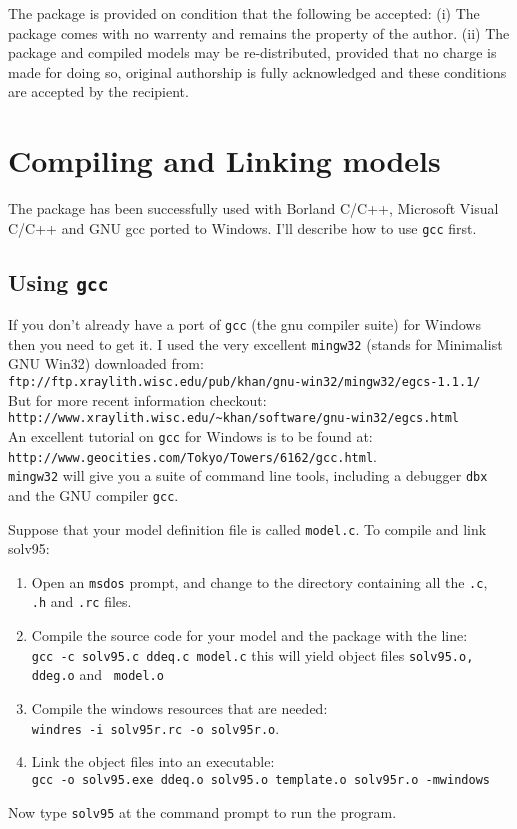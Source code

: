 \documentclass[10pt] {article}
\begin{document}
The package is provided on condition that the following be accepted: (i) The package comes with %
no warrenty and remains the property of the author. (ii) The package and compiled models may be %
re-distributed, provided that no charge is made for doing so, original authorship is fully %
acknowledged and these conditions are accepted by the recipient.   

\section{Compiling and Linking models}

The package has been successfully used with Borland C/C++, Microsoft Visual C/C++ and GNU gcc %
ported to Windows. I'll describe how to use \verb+gcc+ first.

\subsection{Using {\tt gcc}}

If you don't already have a port of \verb+gcc+ (the gnu compiler suite) for Windows then you need %
to get it. I used the very excellent \verb+mingw32+ (stands for Minimalist GNU Win32) downloaded %
from:\\
\verb+ftp://ftp.xraylith.wisc.edu/pub/khan/gnu-win32/mingw32/egcs-1.1.1/+ \\
But for more recent information checkout:\\
\verb+http://www.xraylith.wisc.edu/~khan/software/gnu-win32/egcs.html+\\
An excellent tutorial on \verb+gcc+ for Windows is to be found at:\\
\verb+http://www.geocities.com/Tokyo/Towers/6162/gcc.html+.\\
\verb+mingw32+ will give you a suite of command line tools, including a debugger \verb+dbx+ and %
the GNU compiler \verb+gcc+.

Suppose that your model definition file is called {\tt model.c}. To compile and link solv95:
\begin{enumerate}
\item Open an {\tt msdos} prompt, and change to the directory containing all the {\tt .c}, {\tt %
.h} and {\tt .rc} files.
\item Compile the source code for your model and the package with the line:\\
{\tt gcc -c solv95.c ddeq.c model.c} this will yield object files {\tt solv95.o, ddeg.o} and {\tt %
model.o}
\item Compile the windows resources that are needed:\\
{\tt windres -i solv95r.rc -o solv95r.o}.
\item Link the object files into an executable:\\
{\tt gcc -o solv95.exe ddeq.o solv95.o template.o solv95r.o -mwindows} 
\end{enumerate}
Now type {\tt solv95} at the command prompt to run the program. 
\end{document}
